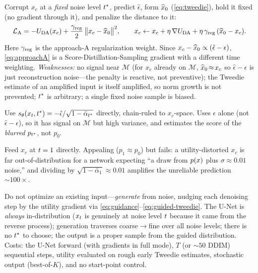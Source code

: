 \begin{description}[leftmargin=1.6em,itemsep=2pt,topsep=2pt]
  \item[A --- L$_2$ penalty toward the Tweedie estimate.] Corrupt $x_{c}$ at a
        \emph{fixed} noise level $t^{*}$, predict $\hat\epsilon$, form $\widehat{x}_{0}$
        (\eqref{eq:tweedie}), hold it fixed (no gradient through it), and penalize
        the distance to it:
        \begin{equation}
        \mathcal{L}_{\mathrm{A}}=-U_{\mathrm{DA}}(x_{c})+\frac{\gamma_{\mathrm{reg}}}{2}\,
           \big\lVert x_{c}-\widehat{x}_{0}\big\rVert^{2},
        \qquad
        x_{c}\leftarrow x_{c}+\eta\,\nabla U_{\mathrm{DA}}+\eta\,\gamma_{\mathrm{reg}}\,(\widehat{x}_{0}-x_{c}).
        \label{eq:approachA}
        \end{equation}
        Here $\gamma_{\mathrm{reg}}$ is the approach-A regularization weight. Since
        $x_{c}-\widehat{x}_{0}\propto(\hat\epsilon-\epsilon)$, \eqref{eq:approachA} is a
        Score-Distillation-Sampling gradient with a different time weighting.
        \emph{Weaknesses:} no signal near $\mathcal{M}$ (for $x_{c}$ already on
        $\mathcal{M}$, $\widehat{x}_{0}\!\approx\!x_{c}$ so $\hat\epsilon-\epsilon$ is just
        reconstruction noise---the penalty is reactive, not preventive); the
        Tweedie estimate of an amplified input is itself amplified, so norm growth
        is not prevented; $t^{*}$ is arbitrary; a single fixed noise sample is
        biased.
  \item[B --- direct score.] Use $s_{\theta}(x_{t},t^{*})=-\hat\epsilon/\sqrt{1-
        \bar\alpha_{t^{*}}}$ directly, chain-ruled to $x_{c}$-space. Uses
        $\hat\epsilon$ alone (not $\hat\epsilon-\epsilon$), so it has signal on
        $\mathcal{M}$ but high variance, and estimates the score of the
        \emph{blurred} $p_{t^{*}}$, not $p_{0}$.
  \item[C --- score without added noise.] Feed $x_{c}$ at $t=1$ directly.
        Appealing ($p_{1}\!\approx\!p_{0}$) but fails: a utility-distorted $x_{c}$
        is far out-of-distribution for a network expecting ``a draw from $p(x)$ plus
        $\sigma\!\approx\!0.01$ noise,'' and dividing by
        $\sqrt{1-\bar\alpha_{1}}\!\approx\!0.01$ amplifies the unreliable
        prediction $\sim\!100\times$.
  \item[D --- full guided reverse diffusion (\emph{adopted}).] Do not optimize an
        existing input---\emph{generate} from noise, nudging each denoising step
        by the utility gradient via \eqref{eq:guidance}--\eqref{eq:guided-tweedie}.
        The U-Net is \emph{always} in-distribution ($x_{t}$ is genuinely at noise
        level $t$ because it came from the reverse process); generation
        traverses coarse$\to$fine over all noise levels; there is no $t^{*}$ to
        choose; the output is a proper sample from the guided distribution. Costs:
        the U-Net forward (with gradients in full mode), $T$ (or $\sim\!50$ DDIM)
        sequential steps, utility evaluated on rough early Tweedie estimates,
        stochastic output (best-of-$K$), and no start-point control.
\end{description}


